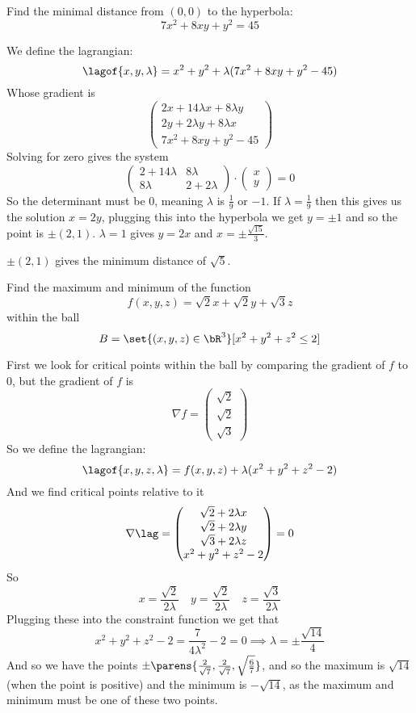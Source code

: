 \documentclass[10pt]{article}
\def\pmat#1{\begin{pmatrix} #1 \end{pmatrix}}
\def\bexerc{\begin{exercise*}}
\def\eexerc{\end{exercise*}}
\def\bblank{\begin{blankpp}}
\def\eblank{\end{blankpp}}
\begin{document}


\bigskip

\bexerc
    Find the minimal distance from $(0,0)$ to the hyperbola:
    \[ 7x^2 + 8xy + y^2 = 45 \]
\eexerc

\bblank
    We define the lagrangian:
    \[ \lagof{x,y,\lambda} = x^2 + y^2 + \lambda(7x^2 + 8xy + y^2 - 45) \]
    Whose gradient is
    \[ \pmat{2x + 14\lambda x + 8\lambda y \\ 2y + 2\lambda y + 8\lambda x \\ 7x^2 + 8xy + y^2 - 45} \]
    Solving for zero gives the system
    \[ \pmat{2 + 14\lambda & 8\lambda \\ 8\lambda & 2 + 2\lambda}\cdot\pmat{x\\y} = 0 \]
    So the determinant must be $0$, meaning $\lambda$ is $\frac19$ or $-1$.
    If $\lambda=\frac19$ then this gives us the solution $x=2y$, plugging this into the hyperbola we get $y=\pm1$ and so the point is $\pm(2,1)$.
    $\lambda=1$ gives $y=2x$ and $x=\pm\frac{\sqrt{15}}3$.

    $\pm(2,1)$ gives the minimum distance of $\sqrt5$.
\eblank

\bexerc
    Find the maximum and minimum of the function
    \[ f(x,y,z) = \sqrt2 x + \sqrt2 y + \sqrt3 z \]
    within the ball
    \[ B = \set{(x,y,z)\in\bR^3}[x^2+y^2+z^2\leq2] \]
\eexerc

\bblank
    First we look for critical points within the ball by comparing the gradient of $f$ to $0$, but the gradient of $f$ is
    \[ \nabla f = \pmat{\sqrt2 \\ \sqrt2 \\ \sqrt3} \]
    So we define the lagrangian:
    \[ \lagof{x,y,z,\lambda} = f(x,y,z) + \lambda(x^2+y^2+z^2-2) \]
    And we find critical points relative to it
    \[ \nabla\lag = \pmat{\sqrt2 + 2\lambda x \\ \sqrt2 + 2\lambda y \\ \sqrt3 + 2\lambda z \\ x^2 + y^2 + z^2 - 2} = 0 \]
    So
    \[ x = \frac{\sqrt2}{2\lambda}\quad y = \frac{\sqrt2}{2\lambda}\quad z = \frac{\sqrt3}{2\lambda} \]
    Plugging these into the constraint function we get that
    \[ x^2+y^2+z^2-2 = \frac{7}{4\lambda^2}-2 = 0 \implies \lambda = \pm\frac{\sqrt{14}}4 \]
    And so we have the points $\pm\parens{\frac2{\sqrt7},\frac2{\sqrt7},\sqrt{\frac67}}$, and so the maximum is $\sqrt{14}$ (when the point is positive) and the minimum is $-\sqrt{14}$, as
    the maximum and minimum must be one of these two points.
\eblank
\end{document}
